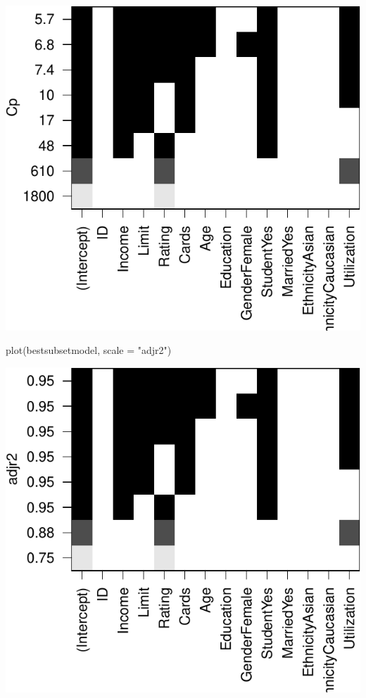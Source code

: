 \documentclass[
]{article}
\newenvironment{Shaded}{\begin{snugshade}}{\end{snugshade}}
\newcommand{\AttributeTok}[1]{\textcolor[rgb]{0.77,0.63,0.00}{#1}}
\newcommand{\FunctionTok}[1]{\textcolor[rgb]{0.00,0.00,0.00}{#1}}
\newcommand{\NormalTok}[1]{#1}
\newcommand{\StringTok}[1]{\textcolor[rgb]{0.31,0.60,0.02}{#1}}
\begin{document}
\begin{center}\includegraphics{SDM-CHAP24_files/figure-latex/unnamed-chunk-6-1} \end{center}

\begin{Shaded}
\begin{Highlighting}[]
\FunctionTok{plot}\NormalTok{(bestsubsetmodel, }\AttributeTok{scale =} \StringTok{"adjr2"}\NormalTok{)}
\end{Highlighting}
\end{Shaded}

\begin{center}\includegraphics{SDM-CHAP24_files/figure-latex/unnamed-chunk-6-2} \end{center}
\end{document}
